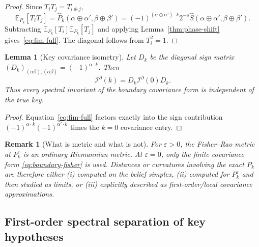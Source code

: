 \documentclass[referee,lineno,pdflatex,sn-mathphys-num]{sn-jnl}
\theoremstyle{thmstylethree}
\theoremstyle{thmstyletwo}
\newtheorem{remark}{Remark}[section]
\theoremstyle{thmstyleone}
\newtheorem{lemma}{Lemma}[section]
\begin{document}
\begin{proof}
Since $T_iT_j=T_{i\oplus j}$,
\[
 \mathbb E_{P_k}[T_iT_j]
 =\widehat P_k(\alpha\oplus\alpha',\beta\oplus\beta')
 =(-1)^{(\alpha\oplus\alpha')\cdot k}2^{-s}
 \widehat S(\alpha\oplus\alpha',\beta\oplus\beta').
\]
Subtracting
$\mathbb E_{P_k}[T_i]\mathbb E_{P_k}[T_j]$ and applying
Lemma~\ref{thm:phase-shift} gives~\eqref{eq:fim-full}.  The diagonal follows
from $T_i^2=1$.
\end{proof}

\begin{lemma}[Key covariance isometry]\label{lem:key-isometry}
Let $D_k$ be the diagonal sign matrix
$(D_k)_{(\alpha\beta),(\alpha\beta)}=(-1)^{\alpha\cdot k}$.  Then
\begin{equation}\label{eq:fim-factor}
  \mathcal I^{\partial}(k)=D_k\mathcal I^{\partial}(0)D_k.
\end{equation}
Thus every spectral invariant of the boundary covariance form is independent of
the true key.
\end{lemma}

\begin{proof}
Equation~\eqref{eq:fim-full} factors exactly into the sign contribution
$(-1)^{\alpha\cdot k}(-1)^{\alpha'\cdot k}$ times the $k=0$ covariance entry.
\end{proof}

\begin{remark}[What is metric and what is not]
For $\varepsilon>0$, the Fisher--Rao metric at $P_k^\varepsilon$ is an ordinary
Riemannian metric.  At $\varepsilon=0$, only the finite covariance form
\eqref{eq:boundary-fisher} is used.  Distances or curvatures involving the
exact $P_k$ are therefore either (i) computed on the belief simplex,
(ii) computed for $P_k^\varepsilon$ and then studied as limits, or
(iii) explicitly described as first-order/local covariance approximations.
\end{remark}

\subsection{First-order spectral separation of key hypotheses}
\end{document}
